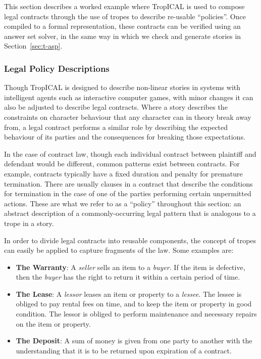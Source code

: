 \documentclass[11pt]{report}
\begin{document}
This section describes a worked example where TropICAL is used to compose legal
contracts through the use of tropes to describe re-usable ``policies''. Once
compiled to a formal representation, these contracts can be verified using an
answer set solver, in the same way in which we check and generate stories in Section~\ref{sec:t-asp}.

\subsubsection{Legal Policy Descriptions}
\label{sec:t-legal}
Though TropICAL is designed to describe non-linear stories in systems with
intelligent agents such as
interactive computer games, with minor changes it can also be adjusted to
describe legal contracts. Where a story describes the constraints on character
behaviour that any character can in theory break away from, a legal contract
performs a similar role by describing the expected behaviour of its parties and
the consequences for breaking those expectations.

In the case of contract law, though each individual contract between plaintiff and
defendant would be different, common patterns exist between contracts. For
example, contracts typically have a fixed duration and penalty for premature
termination. There are usually clauses in a contract that describe the
conditions for termination in the case of one of the parties performing certain
unpermitted actions. These are what we refer to as a ``policy'' throughout this section: an abstract description of
a commonly-occurring legal pattern that is analogous to a trope in a story.

In order to divide legal contracts into reusable components, the concept of tropes can easily be applied to capture fragments of the law. Some
examples are:

\begin{itemize}
\item \textbf{The Warranty}: A \emph{seller} sells an item to a \emph{buyer}. If
  the item is defective, then the \emph{buyer} has the right to return it within
  a certain period of time.
\item \textbf{The Lease}: A \emph{lessor} leases an item or property to a
  \emph{lessee}. The lessee is obliged to pay rental fees on time, and to keep the item
  or property in good condition. The lessor is obliged to perform maintenance
  and necessary repairs on the item or property.
\item \textbf{The Deposit}: A sum of money is given from one party to another
  with the understanding that it is to be returned upon expiration of a contract. 
\end{itemize}
\end{document}
